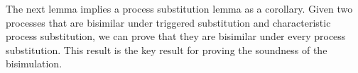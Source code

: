 
The next lemma implies a process substitution lemma as a corollary.
Given two processes that are bisimilar under triggered substitution
and characteristic process substitution, we can prove that they are
bisimilar under every process substitution. This result is
the key result for proving the soundness of the bisimulation. 

%
%
%





